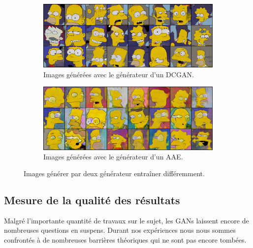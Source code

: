 \documentclass[11pt,francais]{article}
\begin{document}
\begin{figure}[!h]
 \centering
    \begin{subfigure}[b]{\textwidth}
        \includegraphics[width=\textwidth]{Figures/resultats_simpsons/DCGAN_270.png}
        \caption{Images générées avec le générateur d'un DCGAN.}
        \label{fig:fig3}
    \end{subfigure}
    \begin{subfigure}[b]{\textwidth}
        \includegraphics[width=\textwidth]{Figures/resultats_simpsons/AAE_300.png}
        \caption{Images générées avec le générateur d'un AAE.}
        \label{fig:fig4}
    \end{subfigure}
    \caption{Images générer par deux générateur entraîner différemment.}
\end{figure}

\subsection{Mesure de la qualité des résultats}
\label{sec:Mesure}

Malgré l'importante quantité de travaux sur le sujet, les GANs laissent encore de nombreuses questions en suspens. 
Durant nos expériences nous nous sommes confrontés à de nombreuses barrières théoriques qui ne sont pas encore tombées.
\end{document}
